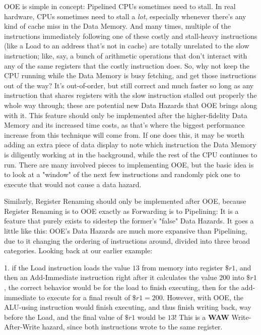 \documentclass[12pt,twoside]{reedthesis}
\begin{document}
OOE is simple in concept: Pipelined CPUs sometimes need to stall. In real hardware, CPUs sometimes need to stall a \textit{lot}, especially whenever there's any kind of cache miss in the Data Memory. And many times, multiple of the instructions immediately following one of these costly and stall-heavy instructions (like a Load to an address that's not in cache) are totally unrelated to the slow instruction; like, say, a bunch of arithmetic operations that don't interact with any of the same registers that the costly instruction does. So, why not keep the CPU running while the Data Memory is busy fetching, and get those instructions out of the way? It's out-of-order, but still correct and much faster so long as any instruction that shares registers with the slow instruction stalled out properly the whole way through; these are potential new Data Hazards that OOE brings along with it. This feature should only be implemented after the higher-fidelity Data Memory and its increased time costs, as that's where the biggest performance increase from this technique will come from. If one does this, it may be worth adding an extra piece of data display to note which instruction the Data Memory is diligently working at in the background, while the rest of the CPU continues to run. There are many involved pieces to implementing OOE, but the basic idea is to look at a "window" of the next few instructions and randomly pick one to execute that would not cause a data hazard.

Similarly, Register Renaming should only be implemented after OOE, because Register Renaming is to OOE exactly as Forwarding is to Pipelining: It is a feature that purely exists to sidestep the former's "false" Data Hazards. It goes a little like this: OOE's Data Hazards are much more expansive than Pipelining, due to it changing the ordering of instructions around, divided into three broad categories. Looking back at our earlier example:

1. if the Load instruction loads the value $13$ from memory into register $\$r1$, and then an Add-Immediate instruction right after it calculates the value $200$ into $\$r1$, the correct behavior would be for the load to finish executing, then for the add-immediate to execute for a final result of $\$r1 = 200$. However, with OOE, the ALU-using instruction would finish executing, and thus finish writing back, way before the Load, and the final value of $\$r1$ would be $13$! This is a \textbf{WAW} Write-After-Write hazard, since both instructions wrote to the same register.
\end{document}
